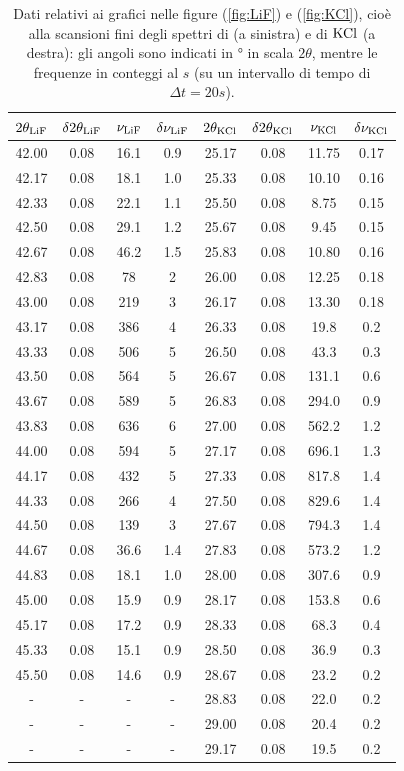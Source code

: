\begin{table}
\centering \small
\begin{tabular}{cccc|cccc}
$2\theta_{\ce{LiF}}$ & $\delta 2\theta_{\ce{LiF}}$ & $\nu_{\ce{LiF}}$ & $\delta \nu_{\ce{LiF}}$ & $2\theta_{\ce{KCl}}$ & $\delta 2\theta_{\ce{KCl}}$ & $\nu_{\ce{KCl}}$ & $\delta \nu_{\ce{KCl}}$ \\
\hline
42.00 & 0.08 & 16.1 & 0.9 & 25.17 & 0.08 & 11.75 & 0.17\\
42.17 & 0.08 & 18.1 & 1.0 & 25.33 & 0.08 & 10.10 & 0.16\\
42.33 & 0.08 & 22.1 & 1.1 & 25.50 & 0.08 & 8.75 & 0.15\\
42.50 & 0.08 & 29.1 & 1.2 & 25.67 & 0.08 & 9.45 & 0.15\\
42.67 & 0.08 & 46.2 & 1.5 & 25.83 & 0.08 & 10.80 & 0.16\\
42.83 & 0.08 & 78 & 2 & 26.00 & 0.08 & 12.25 & 0.18\\
43.00 & 0.08 & 219 & 3 & 26.17 & 0.08 & 13.30 & 0.18\\
43.17 & 0.08 & 386 & 4 & 26.33 & 0.08 & 19.8 & 0.2\\
43.33 & 0.08 & 506 & 5 & 26.50 & 0.08 & 43.3 & 0.3\\
43.50 & 0.08 & 564 & 5 & 26.67 & 0.08 & 131.1 & 0.6\\
43.67 & 0.08 & 589 & 5 & 26.83 & 0.08 & 294.0 & 0.9\\
43.83 & 0.08 & 636 & 6 & 27.00 & 0.08 & 562.2 & 1.2\\
44.00 & 0.08 & 594 & 5 & 27.17 & 0.08 & 696.1 & 1.3\\
44.17 & 0.08 & 432 & 5 & 27.33 & 0.08 & 817.8 & 1.4\\
44.33 & 0.08 & 266 & 4 & 27.50 & 0.08 & 829.6 & 1.4\\
44.50 & 0.08 & 139 & 3 & 27.67 & 0.08 & 794.3 & 1.4\\
44.67 & 0.08 & 36.6 & 1.4 & 27.83 & 0.08 & 573.2 & 1.2\\
44.83 & 0.08 & 18.1 & 1.0 & 28.00 & 0.08 & 307.6 & 0.9\\
45.00 & 0.08 & 15.9 & 0.9 & 28.17 & 0.08 & 153.8 & 0.6\\
45.17 & 0.08 & 17.2 & 0.9 & 28.33 & 0.08 & 68.3 & 0.4\\
45.33 & 0.08 & 15.1 & 0.9 & 28.50 & 0.08 & 36.9 & 0.3\\
45.50 & 0.08 & 14.6 & 0.9 & 28.67 & 0.08 & 23.2 & 0.2\\
  -   &  -   &   -   &  -   & 28.83 & 0.08 & 22.0 & 0.2\\
  -   &  -   &   -   &  -   & 29.00 & 0.08 & 20.4 & 0.2\\
  -   &  -   &   -   &  -   & 29.17 & 0.08 & 19.5 & 0.2
\end{tabular}
\caption{Dati relativi ai grafici nelle figure (\ref{fig:LiF}) e (\ref{fig:KCl}), cioè alla scansioni fini degli spettri di  (a sinistra) e di $ \ce{KCl} $ (a destra): gli angoli sono indicati in $ \unit{\degree} $ in scala $ 2\theta $, mentre le frequenze in conteggi al $ \unit{s} $ (su un intervallo di tempo di $ \Delta t = 20 \unit{s} $).}
\label{tab:LiFKCl}
\end{table}


